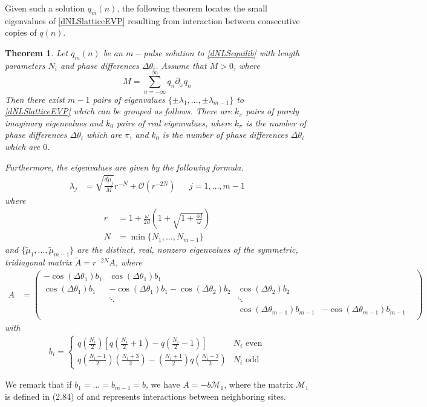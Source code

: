 \documentclass[12pt]{article}
\newtheorem{theorem}{Theorem}
\begin{document}
Given such a solution $q_m(n)$, the following theorem locates the small eigenvalues of \eqref{dNLSlatticeEVP} resulting from interaction between consecutive copies of $q(n)$. 

\begin{theorem}\label{dNLSeigtheorem}
Let $q_m(n)$ be an $m-$pulse solution to \eqref{dNLSequilib} with length parameters $N_i$ and phase differences $\Delta\theta_i$. Assume that $M > 0$, where
\[
M = \sum_{n=-\infty}^\infty q_n \partial_\omega q_n
\]
Then there exist $m-1$ pairs of eigenvalues $\{\pm \lambda_1, \dots, \pm \lambda_{m-1}\}$ to \eqref{dNLSlatticeEVP} which can be grouped as follows. There are $k_\pi$ pairs of purely imaginary eigenvalues and $k_0$ pairs of real eigenvalues, where $k_\pi$ is the number of phase differences $\Delta\theta_i$ which are $\pi$, and $k_0$ is the number of phase differences $\Delta\theta_i$ which are $0$.

Furthermore, the eigenvalues are given by the following formula.
\begin{align}\label{eigsDNLS}
\lambda_j &= \sqrt{\frac{d \tilde{\mu}_j}{M}}r^{-N} + \mathcal{O}(r^{-2N}) && j = 1, \dots, m-1
\end{align}
where 
\begin{align*}
r &= 1 + \frac{\omega}{2 d} \left( 1 + \sqrt{1 + \frac{4 d}{\omega}} \right)\\
N &= \min\{ N_1, \dots, N_{m-1} \} 
\end{align*}
and $\{ \tilde{\mu}_1, \dots, \tilde{\mu}_{m-1} \}$ are the distinct, real, nonzero eigenvalues of the symmetric, tridiagonal matrix $\tilde{A} = r^{-2N} A$, where
\begin{align}\label{dNLSmatrixA}
A &= \begin{pmatrix}
-\cos(\Delta\theta_1) b_1 & \cos(\Delta\theta_1) b_1 & & &  \\
\cos(\Delta\theta_1) b_1 & -\cos(\Delta\theta_1) b_1 - \cos(\Delta\theta_2) b_2 & \cos(\Delta\theta_2) b_2 \\
& \ddots & \ddots \\
& &  \cos(\Delta\theta_{m-1}) b_{m-1} & -\cos(\Delta\theta_{m-1}) b_{m-1}  \\
\end{pmatrix}
\end{align}
with
\begin{align*}
b_i = \begin{cases}
q\left(\frac{N_i}{2}\right) \left[ q\left(\frac{N_i}{2} + 1\right) - q\left(\frac{N_i}{2} - 1\right) \right] & N_i \text{ even} \\
q\left(\frac{N_i-1}{2}\right)\left(\frac{N_i+3}{2}\right) 
- \left(\frac{N_i+1}{2}\right)q\left(\frac{N_i-3}{2}\right) & N_i \text{ odd}
\end{cases}
\end{align*}
\end{theorem}
We remark that if $b_1 = \dots = b_{m-1} = b$, we have $A = -b \mathcal{M}_1$, where the matrix $\mathcal{M}_1$ is defined in (2.84) of \cite{Kevrekidis2009} and represents interactions between neighboring sites.
\end{document}
